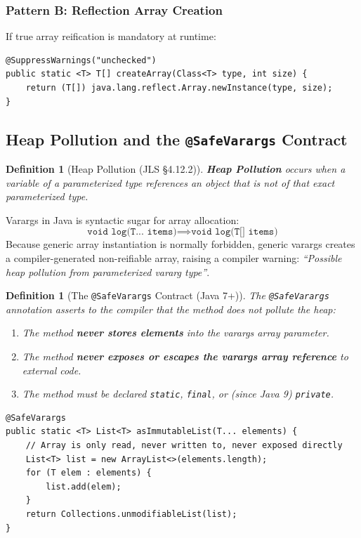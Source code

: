 \documentclass[10pt,journal,compsoc,onecolumn]{IEEEtran}
\newtheorem{definition}[theorem]{Definition}
\begin{document}
\subsubsection{Pattern B: Reflection Array Creation}
If true array reification is mandatory at runtime:
\begin{lstlisting}[caption={Reflection-Based Generic Array Allocation}]
@SuppressWarnings("unchecked")
public static <T> T[] createArray(Class<T> type, int size) {
    return (T[]) java.lang.reflect.Array.newInstance(type, size);
}
\end{lstlisting}

\subsection{Heap Pollution and the \texttt{@SafeVarargs} Contract}
\begin{definition}[Heap Pollution (JLS \S4.12.2)]
\textbf{Heap Pollution} occurs when a variable of a parameterized type references an object that is not of that exact parameterized type.
\end{definition}

Varargs in Java is syntactic sugar for array allocation:
\begin{equation}
\texttt{void log(T... items)} \implies \texttt{void log(T[] items)}
\end{equation}
Because generic array instantiation is normally forbidden, generic varargs creates a compiler-generated non-reifiable array, raising a compiler warning: \emph{``Possible heap pollution from parameterized vararg type''}.

\begin{definition}[The \texttt{@SafeVarargs} Contract (Java 7+)]
The \texttt{@SafeVarargs} annotation asserts to the compiler that the method does not pollute the heap:
\begin{enumerate}
    \item The method \textbf{never stores elements} into the varargs array parameter.
    \item The method \textbf{never exposes or escapes the varargs array reference} to external code.
    \item The method must be declared \texttt{static}, \texttt{final}, or (since Java 9) \texttt{private}.
\end{enumerate}
\end{definition}

\begin{lstlisting}[caption={Safe Varargs Application}]
@SafeVarargs
public static <T> List<T> asImmutableList(T... elements) {
    // Array is only read, never written to, never exposed directly
    List<T> list = new ArrayList<>(elements.length);
    for (T elem : elements) {
        list.add(elem);
    }
    return Collections.unmodifiableList(list);
}
\end{lstlisting}
\end{document}

